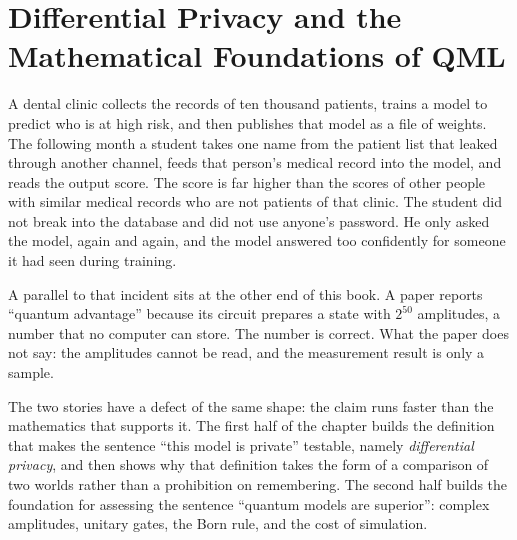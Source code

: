\chapter{Differential Privacy and the Mathematical Foundations of QML}

A dental clinic collects the records of ten thousand patients, trains a model to
predict who is at high risk, and then publishes that model as a file of weights. The
following month a student takes one name from the patient list that leaked through
another channel, feeds that person's medical record into the model, and reads the
output score. The score is far higher than the scores of other people with similar
medical records who are not patients of that clinic. The student did not break into
the database and did not use anyone's password. He only asked the model, again and
again, and the model answered too confidently for someone it had seen during training.

A parallel to that incident sits at the other end of this book. A paper reports
``quantum advantage'' because its circuit prepares a state with $2^{50}$ amplitudes,
a number that no computer can store. The number is correct. What the paper does not
say: the amplitudes cannot be read, and the measurement result is only a sample.

The two stories have a defect of the same shape: the claim runs faster than the
mathematics that supports it. The first half of the chapter builds the definition
that makes the sentence ``this model is private'' testable, namely \emph{differential
privacy}, and then shows why that definition takes the form of a comparison of two
worlds rather than a prohibition on remembering. The second half builds the foundation
for assessing the sentence ``quantum models are superior'': complex amplitudes,
unitary gates, the Born rule, and the cost of simulation.



